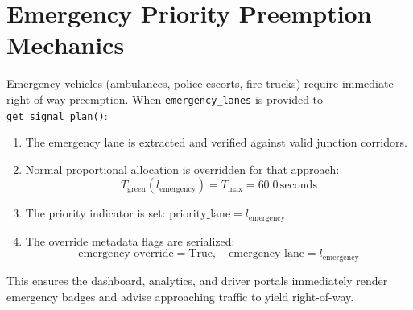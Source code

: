 \section{Emergency Priority Preemption Mechanics}
Emergency vehicles (ambulances, police escorts, fire trucks) require immediate right-of-way preemption. When \texttt{emergency\_lanes} is provided to \texttt{get\_signal\_plan()}:
\begin{enumerate}
    \item The emergency lane is extracted and verified against valid junction corridors.
    \item Normal proportional allocation is overridden for that approach:
    \begin{equation}
    T_{\text{green}}(l_{\text{emergency}}) = T_{\text{max}} = 60.0\,\text{seconds}
    \end{equation}
    \item The priority indicator is set: $\text{priority\_lane} = l_{\text{emergency}}$.
    \item The override metadata flags are serialized:
    \begin{equation}
    \text{emergency\_override} = \text{True}, \quad \text{emergency\_lane} = l_{\text{emergency}}
    \end{equation}
\end{enumerate}
This ensures the dashboard, analytics, and driver portals immediately render emergency badges and advise approaching traffic to yield right-of-way.
